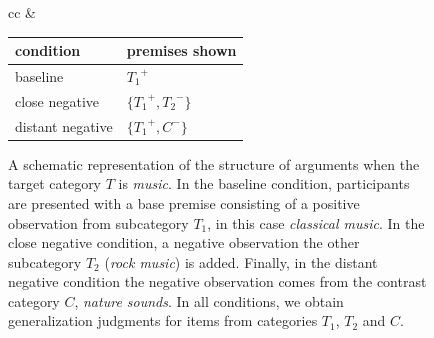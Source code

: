 \documentclass[authoryear,11pt]{elsarticle}
\begin{document}
\begin{figure}[p]
\begin{center}
\begin{tabular}{cc}
\hspace{.5cm}
&
\footnotesize
\begin{tabular}{l|l}
condition & premises shown  \\ \hline
{\sc baseline} & ${T_1}^+$  \\
{\sc close negative} & $\{{T_1}^+, {T_2}^-\}$ \\
{\sc distant negative} & $\{{T_1}^+, {C}^-\}$
\end{tabular}
\end{tabular}
\end{center}
\caption{\small A schematic representation of the structure of arguments when the target category $T$ is {\it music}. In the {\sc baseline} condition, participants are presented with a base premise consisting of a positive observation from subcategory $T_1$, in this case {\it classical music}. In the {\sc close negative} condition, a negative observation the other subcategory $T_2$ ({\it rock music}) is added. Finally, in the {\sc distant negative} condition the negative observation comes from the contrast category $C$, {\it nature sounds}. In all conditions, we obtain generalization judgments for items from categories $T_1$, $T_2$ and $C$.\normalsize}
\label{fig:exp1_itemstruc}
\end{figure}
\end{document}
